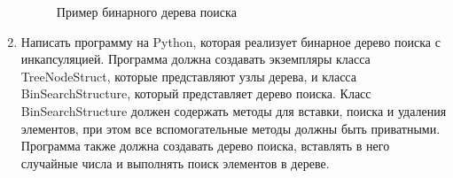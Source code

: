 \begin{enumerate}
\begin{figure}[h]
\centering
{}
\caption{Пример бинарного дерева поиска}
\end{figure}

\item Написать программу на Python, которая реализует бинарное дерево поиска с инкапсуляцией. Программа должна создавать экземпляры класса TreeNodeStruct, которые представляют узлы дерева, и класса BinSearchStructure, который представляет дерево поиска. Класс BinSearchStructure должен содержать методы для вставки, поиска и удаления элементов, при этом все вспомогательные методы должны быть приватными. Программа также должна создавать дерево поиска, вставлять в него случайные числа и выполнять поиск элементов в дереве.


\end{enumerate}

